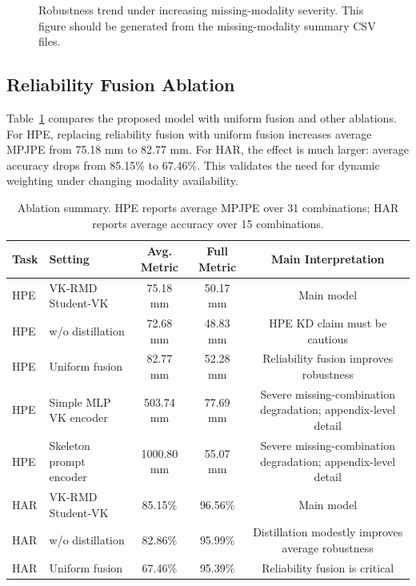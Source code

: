 \documentclass[journal]{IEEEtran}
\newcommand{\ours}{VK-RMD}
\newcommand{\mpjpe}{MPJPE}
\begin{document}
\begin{figure}[t]
    \centering
    \caption{Robustness trend under increasing missing-modality severity. This figure should be generated from the missing-modality summary CSV files.}
    \label{fig:missing_curve}
\end{figure}

\subsection{Reliability Fusion Ablation}

Table~\ref{tab:ablation} compares the proposed model with uniform fusion and other ablations. For HPE, replacing reliability fusion with uniform fusion increases average \mpjpe{} from 75.18 mm to 82.77 mm. For HAR, the effect is much larger: average accuracy drops from 85.15\% to 67.46\%. This validates the need for dynamic weighting under changing modality availability.

\begin{table}[t]
\centering
\caption{Ablation summary. HPE reports average \mpjpe{} over 31 combinations; HAR reports average accuracy over 15 combinations.}
\label{tab:ablation}
\begin{tabular}{llccc}
\toprule
Task & Setting & Avg. Metric & Full Metric & Main Interpretation \\
\midrule
HPE & \ours{} Student-VK & 75.18 mm & 50.17 mm & Main model \\
HPE & w/o distillation & 72.68 mm & 48.83 mm & HPE KD claim must be cautious \\
HPE & Uniform fusion & 82.77 mm & 52.28 mm & Reliability fusion improves robustness \\
HPE & Simple MLP VK encoder & 503.74 mm & 77.69 mm & Severe missing-combination degradation; appendix-level detail \\
HPE & Skeleton prompt encoder & 1000.80 mm & 55.07 mm & Severe missing-combination degradation; appendix-level detail \\
\midrule
HAR & \ours{} Student-VK & 85.15\% & 96.56\% & Main model \\
HAR & w/o distillation & 82.86\% & 95.99\% & Distillation modestly improves average robustness \\
HAR & Uniform fusion & 67.46\% & 95.39\% & Reliability fusion is critical \\
\bottomrule
\end{tabular}
\end{table}
\end{document}
